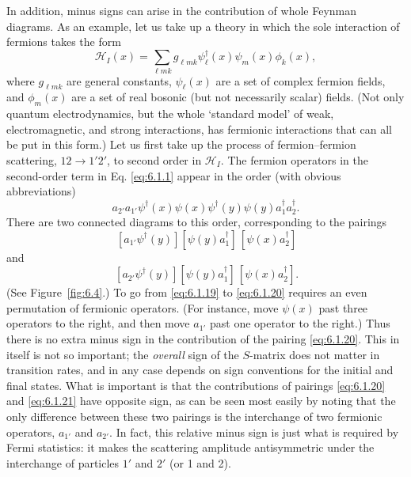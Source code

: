 In addition, minus signs can arise in the contribution of whole Feynman
diagrams. As an example, let us take up a theory in which the sole interaction
of fermions takes the form
\begin{equation}
\mathcal H_I(x)=\sum_{\ell m k}g_{\ell m k}\psi_\ell^\dagger(x)
 \psi_m(x)\phi_k(x),
\tag{6.1.18}
\label{eq:6.1.18}
\end{equation}
where $g_{\ell m k}$ are general constants, $\psi_\ell(x)$ are a set of complex
fermion fields, and $\phi_m(x)$ are a set of real bosonic (but not necessarily
scalar) fields. (Not only quantum electrodynamics, but the whole `standard
model' of weak, electromagnetic, and strong interactions, has fermionic
interactions that can all be put in this form.) Let us first take up the
process of fermion--fermion scattering, $12\to1'2'$, to second order in
$\mathcal H_I$. The fermion operators in the second-order term in Eq. \eqref{eq:6.1.1}
appear in the order (with obvious abbreviations)
\begin{equation}
a_{2'}a_{1'}\psi^\dagger(x)\psi(x)\psi^\dagger(y)\psi(y)
 a^\dagger_{1}a^\dagger_{2}.
\tag{6.1.19}
\label{eq:6.1.19}
\end{equation}
There are two connected diagrams to this order, corresponding to the pairings
\begin{equation}
[a_{2'}\psi^\dagger(x)]\,[a_{1'}\psi^\dagger(y)]
 [\psi(y)a^\dagger_{1}]\,[\psi(x)a^\dagger_{2}]
\tag{6.1.20}
\label{eq:6.1.20}
\end{equation}
and
\begin{equation}
[a_{1'}\psi^\dagger(x)]\,[a_{2'}\psi^\dagger(y)]
 [\psi(y)a^\dagger_{1}]\,[\psi(x)a^\dagger_{2}].
\tag{6.1.21}
\label{eq:6.1.21}
\end{equation}
(See Figure~\ref{fig:6.4}.) To go from \eqref{eq:6.1.19} to \eqref{eq:6.1.20} requires an even permutation
of fermionic operators. (For instance, move $\psi(x)$ past three operators to
the right, and then move $a_{1'}$ past one operator to the right.) Thus there is
no extra minus sign in the contribution of the pairing \eqref{eq:6.1.20}. This in itself
is not so important; the \emph{overall} sign of the $S$-matrix does not matter
in transition rates, and in any case depends on sign conventions for the
initial and final states. What is important is that the contributions of
pairings \eqref{eq:6.1.20} and \eqref{eq:6.1.21} have opposite sign, as can be seen most easily
by noting that the only difference between these two pairings is the
interchange of two fermionic operators, $a_{1'}$ and $a_{2'}$. In fact, this
relative minus sign is just what is required by Fermi statistics: it makes the
scattering amplitude antisymmetric under the interchange of particles $1'$ and
$2'$ (or 1 and 2).

